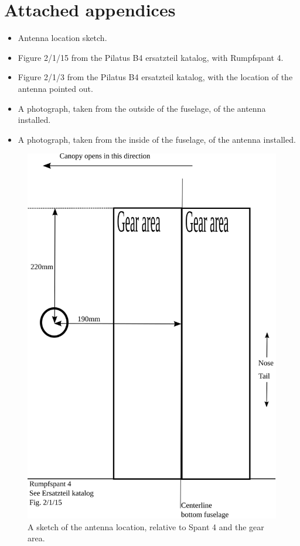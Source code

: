 \documentclass[twoside]{article}
\begin{document}
\section{Attached appendices}
\begin{itemize}
\item[Figure \ref{fig:antenna_location}]{Antenna location sketch.}
\item[Figure \ref{fig:ersatzteil_rumpfspant4}]{Figure 2/1/15 from the Pilatus B4 ersatzteil katalog, with Rumpfspant 4.}
\item[Figure \ref{fig:ersatzteil_antenna}]{Figure 2/1/3 from the Pilatus B4 ersatzteil katalog, with the location of the antenna pointed out.}
\item[Figure \ref{fig:outside}]{A photograph, taken from the outside of the fuselage, of the antenna installed.}
\item[Figure \ref{fig:inside}]{A photograph, taken from the inside of the fuselage, of the antenna installed.}
\end{itemize}

\begin{figure}
\includegraphics[width=\textwidth,keepaspectratio]{antenna_location}
\caption{A sketch of the antenna location, relative to Spant 4 and the gear area.}
\label{fig:antenna_location}
\end{figure}
\end{document}
